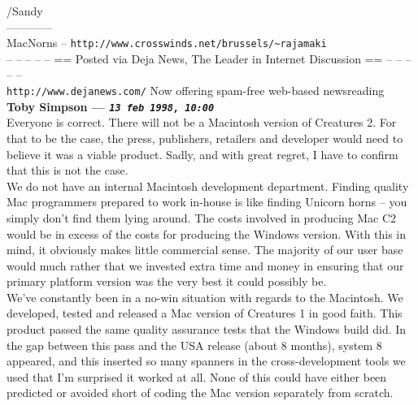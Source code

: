 \documentclass[11pt,twoside,a4paper]{article}
\begin{document}
\begin{multicols*}{2}
/Sandy ~\\
------------ ~\\
MacNorns -- \texttt{http://www.crosswinds.net/brussels/\textasciitilde rajamaki} ~\\

-- -- -- -- -- == Posted via Deja News, The Leader in Internet Discussion == -- -- -- -- --  ~\\
\texttt{http://www.dejanews.com/}   Now offering spam-free web-based newsreading ~\\

 
		
	
		
\textbf{Toby Simpson --- \emph{\texttt{13 feb 1998, 10:00}}}~\\

Everyone is correct. There will not be a Macintosh version of Creatures 2. For that to be the case, the press, publishers, retailers and developer would need to believe it was a viable product. Sadly, and with great regret, I have to confirm that this is not the case. ~\\

We do not have an internal Macintosh development department. Finding quality Mac programmers prepared to work in-house is like finding Unicorn horns -- you simply don't find them lying around. The costs involved in producing Mac C2 would be in excess of the costs for producing the Windows version. With this in mind, it obviously makes little commercial sense. The majority of our user base would much rather that we invested extra time and money in ensuring that our primary platform version was the very best it could possibly be. ~\\

We've constantly been in a no-win situation with regards to the Macintosh. We developed, tested and released a Mac version of Creatures 1 in good faith. This product passed the same quality assurance tests that the Windows build did. In the gap between this pass and the USA release (about 8 months), system 8 appeared, and this inserted so many spanners in the cross-development tools we used that I'm surprised it worked at all. None of this could have either been predicted or avoided short of coding the Mac version separately from scratch. ~\\


\end{multicols*}
\end{document}
